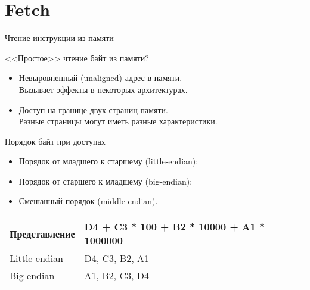 \section{Fetch}

\begin{frame}{Чтение инструкции из памяти}

<<Простое>> чтение байт из памяти?

\pause

\begin{itemize}
    \item Невыровненный (\abbr unaligned) адрес в памяти. \\
    Вызывает эффекты в некоторых архитектурах.
    \pause\bigskip
    \item Доступ на границе двух страниц памяти. \\
    Разные страницы могут иметь разные характеристики.
\end{itemize}

\end{frame}

\begin{frame}{Порядок байт при доступах}

\begin{itemize}
    \item Порядок от младшего к старшему (\abbr little-endian);
    \item Порядок от старшего к младшему (\abbr big-endian);
    \item Смешанный порядок (\abbr middle-endian).
\end{itemize}

\pause

\begin{table}[htpb]
    \centering
    \begin{tabular}{|l|l|}
    \hline
    Представление   &   D4 + C3 * 100 + B2 * 10000 + A1 * 1000000   \\
    \hline
    Little-endian   &   D4, C3, B2, A1                              \\
    \hline
    Big-endian      &   A1, B2, C3, D4                              \\
    \hline
    \end{tabular}
\end{table}

\end{frame}

